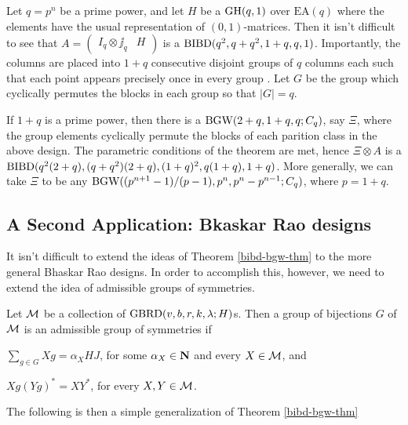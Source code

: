 \documentclass[../../../main]{subfiles}
\begin{document}
 \begin{ex}
  Let $q=p^n$ be a prime power, and let $H$ be a $\text{GH}(q,1)$ over $\text{EA}(q)$
  where the elements have the usual representation of $(0,1)$-matrices. Then it
  isn't difficult to see that $A=(\begin{smallmatrix} I_q \otimes \jj_q &
                                                                          H \end{smallmatrix})$ is a $\text{BIBD}(q^2,q+q^2,1+q,q,1)$. Importantly, the columns are placed into $1+q$ consecutive disjoint groups of $q$ columns each such that each point appears precisely once in every group . Let $G$ be the group which cyclically permutes the blocks in each group so that $|G|=q$.
  
  If $1+q$ is a prime power, then there is a $\text{BGW}(2+q,1+q,q;C_q)$, say $\Xi$, where the group elements cyclically permute the blocks of each parition class in the above design. The parametric conditions of the theorem are met, hence $\Xi \otimes A$ is a $\text{BIBD}(q^2(2+q),(q+q^2)(2+q),(1+q)^2,q(1+q),1+q)$. More generally, we can take $\Xi$ to be any $\text{BGW}((p^{n+1}-1)/(p-1),p^n,p^n-p^{n-1};C_q)$, where $p=1+q$.
 \end{ex}

\dinkus

\subsection{A Second Application: Bkaskar Rao designs}

It isn't difficult to extend the ideas of Theorem \ref{bibd-bgw-thm} to the more general Bhaskar Rao designs. In order to accomplish this, however, we need to extend the idea of admissible groups of symmetries.

Let $\mathcal{M}$ be a collection of $\text{GBRD}(v,b,r,k,\lambda;H)$s. Then a group of bijections $G$ of $\mathcal{M}$ is an admissible group of symmetries if 
\begin{enumerate*}[(a)]
\item $\sum_{g \in G}Xg=\alpha_XHJ$, for some $\alpha_X \in \mathbf{N}$ and every $X \in \mathcal{M}$, and 
\item $Xg(Yg)^* = XY^*$, for every $X,Y \in \mathcal{M}$.
\end{enumerate*}

The following is then a simple generalization of Theorem \ref{bibd-bgw-thm}
\end{document}
